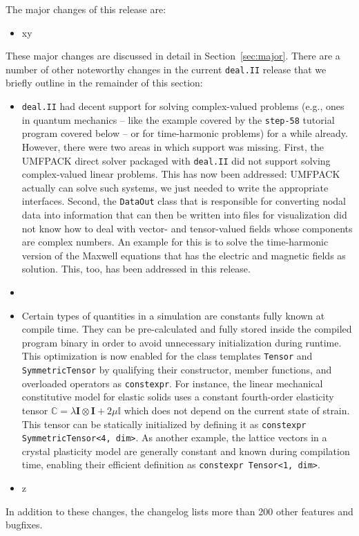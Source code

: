 \documentclass{ansarticle-preprint}
\newcommand{\specialword}[1]{\texttt{#1}}
\newcommand{\dealii}{{\specialword{deal.II}}\xspace}
\begin{document}
The major changes of this release are:
%
\begin{itemize}
\item xy 
\end{itemize}
%
These major changes are discussed in detail in Section~\ref{sec:major}. There
are a number of other noteworthy changes in the current \dealii{} release
that we briefly outline in the remainder of this section:
%
\begin{itemize}
\item \dealii{} had decent support for solving complex-valued problems
  (e.g., ones in quantum mechanics -- like the example covered by the
  \texttt{step-58} tutorial program covered below -- or for
  time-harmonic problems) for a while already. However, there were two
  areas in which support was missing. First, the UMFPACK direct solver
  packaged with \dealii{} did not support solving complex-valued
  linear problems. This has now been addressed: UMFPACK actually can
  solve such systems, we just needed to write the appropriate
  interfaces. Second, the \texttt{DataOut} class that is responsible
  for converting nodal data into information that can then be written
  into files for visualization did not know how to deal with vector-
  and tensor-valued fields whose components are complex numbers. An
  example for this is to solve the time-harmonic version of the
  Maxwell equations that has the electric and magnetic fields as
  solution. This, too, has been addressed in this release.
  \item {}
\item Certain types of quantities in a simulation are constants fully known
  at compile time. They can be pre-calculated and fully stored inside the
  compiled program binary in order to avoid unnecessary initialization during
  runtime. This optimization is now enabled for the class templates
  \texttt{Tensor} and \texttt{SymmetricTensor} by qualifying their constructor,
  member functions, and overloaded operators as \texttt{constexpr}.
  For instance, the linear mechanical constitutive model for elastic solids
  uses a constant fourth-order elasticity tensor
  $\mathbb{C} = \lambda \boldsymbol{I} \otimes \boldsymbol{I} + 2 \mu \mathbb{I}$
  which does not depend on the current state of strain.
  This tensor can be statically initialized by defining it as
  \texttt{constexpr SymmetricTensor<4, dim>}.
  As another example, the lattice vectors in a crystal plasticity model are generally
  constant and known during compilation time, enabling their efficient definition as
  \texttt{constexpr Tensor<1, dim>}.
\item z 
\end{itemize}
%
In addition to these changes, the changelog lists more than 200 other
features and bugfixes.
\end{document}
